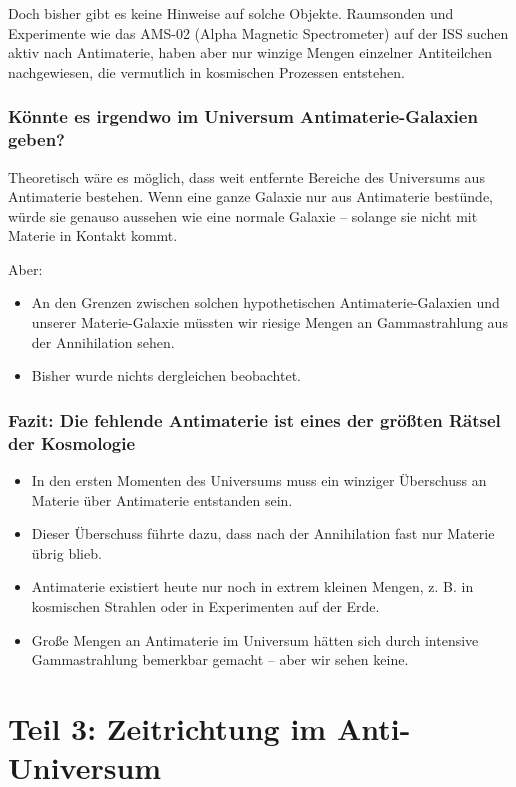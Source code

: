 \documentclass{article}
\begin{document}
	Doch bisher gibt es keine Hinweise auf solche Objekte. Raumsonden und Experimente wie das AMS-02 (Alpha Magnetic Spectrometer) auf der ISS suchen aktiv nach Antimaterie, haben aber nur winzige Mengen einzelner Antiteilchen nachgewiesen, die vermutlich in kosmischen Prozessen entstehen.
	
	\subsubsection{Könnte es irgendwo im Universum Antimaterie-Galaxien geben?}
	Theoretisch wäre es möglich, dass weit entfernte Bereiche des Universums aus Antimaterie bestehen. Wenn eine ganze Galaxie nur aus Antimaterie bestünde, würde sie genauso aussehen wie eine normale Galaxie – solange sie nicht mit Materie in Kontakt kommt.
	
	Aber:
	\begin{itemize}
		\item An den Grenzen zwischen solchen hypothetischen Antimaterie-Galaxien und unserer Materie-Galaxie müssten wir riesige Mengen an Gammastrahlung aus der Annihilation sehen.
		\item Bisher wurde nichts dergleichen beobachtet.
	\end{itemize}
	
	\subsubsection{Fazit: Die fehlende Antimaterie ist eines der größten Rätsel der Kosmologie}
	\begin{itemize}
		\item In den ersten Momenten des Universums muss ein winziger Überschuss an Materie über Antimaterie entstanden sein.
		\item Dieser Überschuss führte dazu, dass nach der Annihilation fast nur Materie übrig blieb.
		\item Antimaterie existiert heute nur noch in extrem kleinen Mengen, z. B. in kosmischen Strahlen oder in Experimenten auf der Erde.
		\item Große Mengen an Antimaterie im Universum hätten sich durch intensive Gammastrahlung bemerkbar gemacht – aber wir sehen keine.
	\end{itemize}
	
	\section{Teil 3: Zeitrichtung im Anti-Universum}
	
\end{document}

